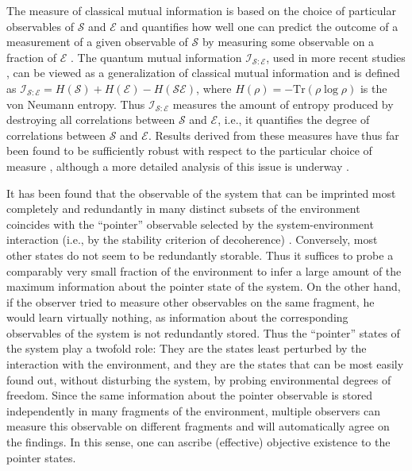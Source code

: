 \documentclass[twocolumn,aps,floatfix,amsmath,amssymb,showpacs,nofootinbib]{revtex4}
\begin{document}
The measure of classical mutual information is based on the choice of
particular observables of $\mathcal{S}$ and $\mathcal{E}$ and
quantifies how well one can predict the outcome of a measurement of a
given observable of $\mathcal{S}$ by measuring some observable on a
fraction of $\mathcal{E}$ \cite{Ollivier:2003:za,Ollivier:2004:im}.
The quantum mutual information
$\mathcal{I}_{\mathcal{S}:\mathcal{E}}$, used in more recent studies
\cite{Zurek:2002:ii,Blume:2004:oo,Blume:2005:oo}, can be viewed as a
generalization of classical mutual information and is defined as
$\mathcal{I}_{\mathcal{S}:\mathcal{E}} = H(\mathcal{S}) +
H(\mathcal{E}) - H(\mathcal{SE})$, where $H(\rho) = -\text{Tr} (\rho
\log \rho)$ is the von Neumann entropy. Thus
$\mathcal{I}_{\mathcal{S}:\mathcal{E}}$ measures the amount of entropy
produced by destroying all correlations between $\mathcal{S}$ and
$\mathcal{E}$, i.e., it quantifies the degree of correlations between
$\mathcal{S}$ and $\mathcal{E}$. Results derived from these measures
have thus far been found to be sufficiently robust with respect to the
particular
choice of measure \cite{Ollivier:2003:za,Ollivier:2004:im,Zurek:2002:ii,%
  Blume:2004:oo,Blume:2005:oo}, although a more detailed analysis of
this issue is underway \cite{Blume:2005:oo}.

It has been found that the observable of the system that can be
imprinted most completely and redundantly in many distinct subsets of
the environment coincides with the ``pointer'' observable selected by
the system-environment interaction (i.e., by the stability criterion
of decoherence)
\cite{Ollivier:2003:za,Ollivier:2004:im,Blume:2004:oo,Blume:2005:oo}.
Conversely, most other states do not seem to be redundantly storable.
Thus it suffices to probe a comparably very small fraction of the
environment to infer a large amount of the maximum information about
the pointer state of the system.  On the other hand, if the observer
tried to measure other observables on the same fragment, he would
learn virtually nothing, as information about the corresponding
observables of the system is not redundantly stored.  Thus the
``pointer'' states of the system play a twofold role: They are the
states least perturbed by the interaction with the environment, and
they are the states that can be most easily found out, without
disturbing the system, by probing environmental degrees of freedom.
Since the same information about the pointer observable is stored
independently in many fragments of the environment, multiple observers
can measure this observable on different fragments and will
automatically agree on the findings. In this sense, one can ascribe
(effective) objective existence to the pointer states.
\end{document}
